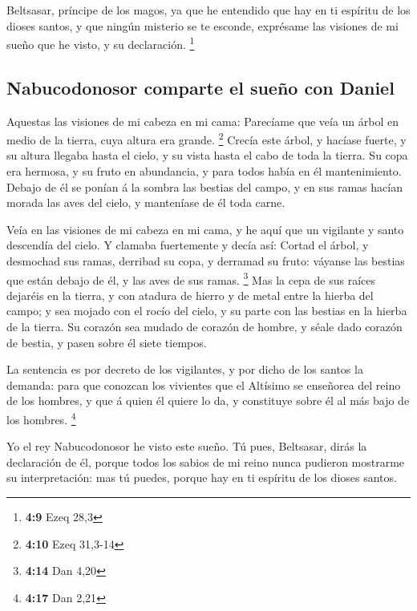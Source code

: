  Beltsasar, príncipe de los magos, ya que he entendido que
hay en ti espíritu de los dioses santos, y que ningún misterio se te
esconde, exprésame las visiones de mi sueño que he visto, y su
declaración. \footnote{\textbf{4:9} Ezeq 28,3}

\hypertarget{nabucodonosor-comparte-el-sueuxf1o-con-daniel}{%
\subsection{Nabucodonosor comparte el sueño con
Daniel}\label{nabucodonosor-comparte-el-sueuxf1o-con-daniel}}

 Aquestas las visiones de mi cabeza en mi cama: Parecíame
que veía un árbol en medio de la tierra, cuya altura era grande.
\footnote{\textbf{4:10} Ezeq 31,3-14}  Crecía este árbol, y
hacíase fuerte, y su altura llegaba hasta el cielo, y su vista hasta el
cabo de toda la tierra.  Su copa era hermosa, y su fruto en
abundancia, y para todos había en él mantenimiento. Debajo de él se
ponían á la sombra las bestias del campo, y en sus ramas hacían morada
las aves del cielo, y manteníase de él toda carne.

 Veía en las visiones de mi cabeza en mi cama, y he aquí
que un vigilante y santo descendía del cielo.  Y clamaba
fuertemente y decía así: Cortad el árbol, y desmochad sus ramas,
derribad su copa, y derramad su fruto: váyanse las bestias que están
debajo de él, y las aves de sus ramas. \footnote{\textbf{4:14} Dan 4,20}
 Mas la cepa de sus raíces dejaréis en la tierra, y con
atadura de hierro y de metal entre la hierba del campo; y sea mojado con
el rocío del cielo, y su parte con las bestias en la hierba de la
tierra.  Su corazón sea mudado de corazón de hombre, y
séale dado corazón de bestia, y pasen sobre él siete tiempos.

 La sentencia es por decreto de los vigilantes, y por dicho
de los santos la demanda: para que conozcan los vivientes que el
Altísimo se enseñorea del reino de los hombres, y que á quien él quiere
lo da, y constituye sobre él al más bajo de los hombres. \footnote{\textbf{4:17}
  Dan 2,21}

 Yo el rey Nabucodonosor he visto este sueño. Tú pues,
Beltsasar, dirás la declaración de él, porque todos los sabios de mi
reino nunca pudieron mostrarme su interpretación: mas tú puedes, porque
hay en ti espíritu de los dioses santos.


